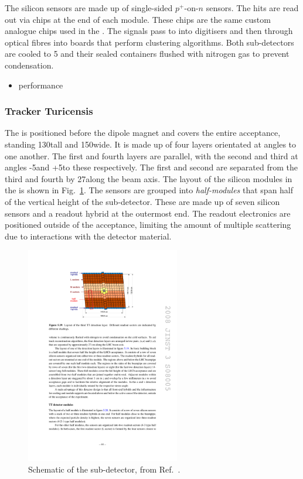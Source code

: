 The silicon sensors are made up of single-sided $p^{+}$-on-$n$ sensors. The hits are read out via chips at the end of each module. These chips are the same custom analogue \beetle chips used in the \velo. The signals pass to into digitisers and then through optical fibres into  boards that perform clustering algorithms.
Both sub-detectors are cooled to 5 and their sealed containers flushed with nitrogen gas to prevent condensation.


{\color{Red}
\begin{itemize}
\item performance
\end{itemize}
}


\subsubsection{Tracker Turicensis}

The \ttracker is positioned before the dipole magnet and covers the entire \lhcb acceptance, standing 130\cm tall and 150\cm wide.
It is made up of four layers orientated at angles to one another. The first and fourth layers are parallel, with the second and third at angles -5\degrees and +5\degrees to these respectively. The first and second are separated from the third and fourth by 27\cm along the beam axis. The layout of the silicon modules in the \ttracker is shown in Fig.~\ref{fig:Dec_tt_layout}. The sensors are grouped into \emph{half-modules} that span half of the vertical height of the sub-detector. These are made up of seven silicon sensors and a readout hybrid at the outermost end. The readout electronics are positioned outside of the \lhcb acceptance, limiting the amount of multiple scattering due to interactions with the detector material. 

\begin{figure}[!h]
    \centering
    \includegraphics[width=0.6\textwidth]{figs/Detector/tt_layout.pdf}
    \caption{Schematic of the \ttracker sub-detector, from Ref.~\cite{Alves:2008zz}.}
    \label{fig:Dec_tt_layout}   
\end{figure}

